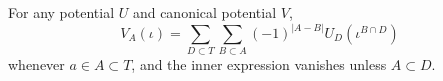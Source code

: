 For any potential $U$ and canonical potential $V$,
$$V_A(\iota) = \sum_{D \subset T} \sum_{B \subset A} (-1)^{|A - B|} U_D(\iota^{B \cap D})$$
whenever $a \in A \subset T$, and the inner expression vanishes unless $A \subset D$.
